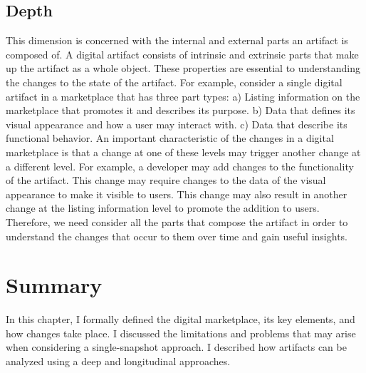 \subsection{Depth}
This dimension is concerned with the internal and external parts an artifact is composed of.
A digital artifact consists of intrinsic and extrinsic parts that make up the artifact as a whole object.
These properties are essential to understanding the changes to the state of the artifact.
For example, consider a single digital artifact in a marketplace that has three part types:
a) Listing information on the marketplace that promotes it and describes its purpose.
b) Data that defines its visual appearance and how a user may interact with.
c) Data that describe its functional behavior.
An important characteristic of the changes in a digital marketplace is that a change at one of these levels may trigger another change at a different level.
For example, a developer may add changes to the functionality of the artifact.
This change may require changes to the data of the visual appearance to make it visible to users.
This change may also result in another change at the listing information level to promote the addition to users.
Therefore, we need consider all the parts that compose the artifact in order to understand the changes that occur to them over time and gain useful insights.

\section{Summary}
In this chapter, I formally defined the digital marketplace, its key elements, and how changes take place.
I discussed the limitations and problems that may arise when considering a single-snapshot approach.
I described how artifacts can be analyzed using a deep and longitudinal approaches.